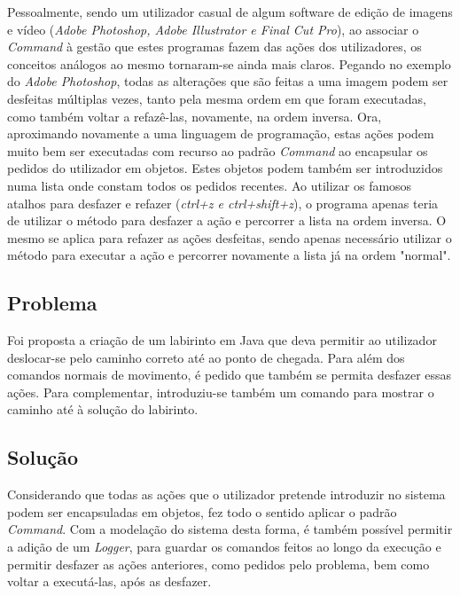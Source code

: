 \documentclass[10pt,portuguese]{article}
\begin{document}
\par Pessoalmente, sendo um utilizador casual de algum software de edição de imagens e vídeo (\textit{Adobe Photoshop, Adobe Illustrator e Final Cut Pro}), ao associar o \textit{Command} à gestão que estes programas fazem das ações dos utilizadores, os conceitos análogos ao mesmo tornaram-se ainda mais claros. Pegando no exemplo do \textit{Adobe Photoshop}, todas as alterações que são feitas a uma imagem podem ser desfeitas múltiplas vezes, tanto pela mesma ordem em que foram executadas, como também voltar a refazê-las, novamente, na ordem inversa. 
Ora, aproximando novamente a uma linguagem de programação, estas ações podem muito bem ser executadas com recurso ao padrão \textit{Command} ao encapsular os pedidos do utilizador em objetos. Estes objetos podem também ser introduzidos numa lista onde constam todos os pedidos recentes. 
Ao utilizar os famosos atalhos para desfazer e refazer (\textit{ctrl+z e ctrl+shift+z}), o programa apenas teria de utilizar o método para desfazer a ação e percorrer a lista na ordem inversa. O mesmo se aplica para refazer as ações desfeitas, sendo apenas necessário utilizar o método para executar a ação e percorrer novamente a lista já na ordem "normal".

\clearpage

\subsection{Problema}

\par Foi proposta a criação de um labirinto em Java que deva permitir ao utilizador deslocar-se pelo caminho correto até ao ponto de chegada. Para além dos comandos normais de movimento, é pedido que também se permita desfazer essas ações. Para complementar, introduziu-se também um comando para mostrar o caminho até à solução do labirinto.

\subsection{Solução}

\par Considerando que todas as ações que o utilizador pretende introduzir no sistema podem ser encapsuladas em objetos, fez todo o sentido aplicar o padrão \textit{Command}. Com a modelação do sistema desta forma, é também possível permitir a adição de um \textit{Logger}, para guardar os comandos feitos ao longo da execução e permitir desfazer as ações anteriores, como pedidos pelo problema, bem como voltar a executá-las, após as desfazer.
\end{document}
